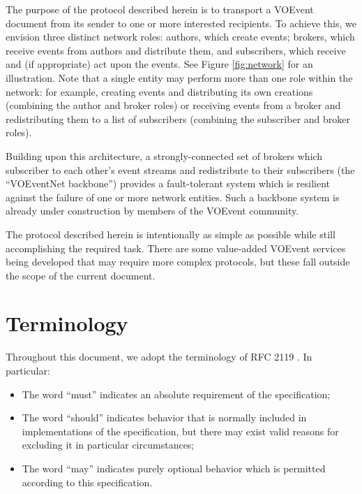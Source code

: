 \documentclass[a4paper,11pt]{ivoa}
\begin{document}
The purpose of the protocol described herein is to transport a VOEvent
document from its sender to one or more interested recipients. To achieve
this, we envision three distinct network roles: authors, which create events;
brokers, which receive events from authors and distribute them, and
subscribers, which receive and (if appropriate) act upon the events. See
Figure \ref{fig:network} for an illustration. Note that a single entity may
perform more than one role within the network: for example, creating events
and distributing its own creations (combining the author and broker roles) or
receiving events from a broker and redistributing them to a list of
subscribers (combining the subscriber and broker roles).

Building upon this architecture, a strongly-connected set of brokers which
subscriber to each other's event streams and redistribute to their subscribers
(the ``VOEventNet backbone'') provides a fault-tolerant system which is
resilient against the failure of one or more network entities. Such a backbone
system is already under construction by members of the VOEvent community.

The protocol described herein is intentionally as simple as possible while
still accomplishing the required task. There are some value-added VOEvent
services being developed that may require more complex protocols, but these
fall outside the scope of the current document.

\section{Terminology}

Throughout this document, we adopt the terminology of RFC 2119
\citep{Bradner:1997}. In particular:

\begin{itemize}
    \item{The word ``must'' indicates an absolute requirement of the
    specification;}

    \item{The word ``should'' indicates behavior that is normally included in
    implementations of the specification, but there may exist valid reasons
    for excluding it in particular circumstances;}

    \item{The word ``may'' indicates purely optional behavior which is
    permitted according to this specification.}
\end{itemize}
\end{document}
